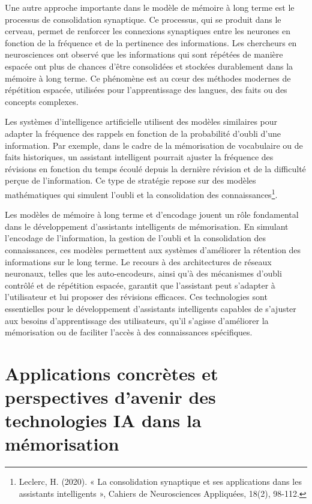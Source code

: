 \documentclass[11pt,a4paper]{report}
\begin{document}
Une autre approche importante dans le modèle de mémoire à long terme est le processus de consolidation synaptique. Ce processus, qui se produit dans le cerveau, permet de renforcer les connexions synaptiques entre les neurones en fonction de la fréquence et de la pertinence des informations. Les chercheurs en neurosciences ont observé que les informations qui sont répétées de manière espacée ont plus de chances d’être consolidées et stockées durablement dans la mémoire à long terme. Ce phénomène est au cœur des méthodes modernes de répétition espacée, utilisées pour l'apprentissage des langues, des faits ou des concepts complexes.

Les systèmes d'intelligence artificielle utilisent des modèles similaires pour adapter la fréquence des rappels en fonction de la probabilité d’oubli d’une information. Par exemple, dans le cadre de la mémorisation de vocabulaire ou de faits historiques, un assistant intelligent pourrait ajuster la fréquence des révisions en fonction du temps écoulé depuis la dernière révision et de la difficulté perçue de l’information. Ce type de stratégie repose sur des modèles mathématiques qui simulent l'oubli et la consolidation des connaissances\footnote{Leclerc, H. (2020). « La consolidation synaptique et ses applications dans les assistants intelligents », Cahiers de Neurosciences Appliquées, 18(2), 98-112.}.

Les modèles de mémoire à long terme et d’encodage jouent un rôle fondamental dans le développement d’assistants intelligents de mémorisation. En simulant l’encodage de l’information, la gestion de l’oubli et la consolidation des connaissances, ces modèles permettent aux systèmes d’améliorer la rétention des informations sur le long terme. Le recours à des architectures de réseaux neuronaux, telles que les auto-encodeurs, ainsi qu’à des mécanismes d’oubli contrôlé et de répétition espacée, garantit que l’assistant peut s’adapter à l’utilisateur et lui proposer des révisions efficaces. Ces technologies sont essentielles pour le développement d’assistants intelligents capables de s’ajuster aux besoins d’apprentissage des utilisateurs, qu’il s’agisse d’améliorer la mémorisation ou de faciliter l’accès à des connaissances spécifiques.

\chapter{Applications concrètes et perspectives d’avenir des technologies IA dans la mémorisation}
\end{document}
